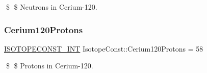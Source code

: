 \$ \$ Neutrons in Cerium-\/120. \mbox{\label{group___isotope_const-_cerium-_ce120_gab514b4c405bbdf8404b29ba47d3943ce}} 
\subsubsection{\texorpdfstring{Cerium120\+Protons}{Cerium120Protons}}
{\footnotesize\ttfamily \mbox{\hyperlink{group___isotope_const-_macros_ga5f18360b3e99483a35c32d789e62621c}{I\+S\+O\+T\+O\+P\+E\+C\+O\+N\+S\+T\+\_\+\+I\+NT}} Isotope\+Const\+::\+Cerium120\+Protons = 58}

\$ \$ Protons in Cerium-\/120. 